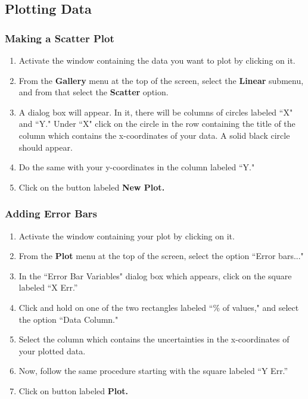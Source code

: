\subsection{Plotting Data}

\subsubsection{Making a Scatter Plot}

\noindent
\begin{enumerate}
\item Activate the window containing the data you want to plot by clicking on it.
\item From the {\bf Gallery} menu at the top of the screen, select the {\bf Linear}
submenu, and from that select the {\bf Scatter} option.
\item A dialog box will appear. In it, there will be columns of circles labeled ``X"
and ``Y." Under ``X" click on the circle in the row containing the
title of the column which contains the x-coordinates of your data. A
solid black circle should appear.
\item Do the same with your y-coordinates in the column labeled ``Y."
\item Click on the button labeled {\bf New Plot.}
\end{enumerate}
\indent

\subsubsection{Adding Error Bars}

\noindent
\begin{enumerate}
\item Activate the window containing your plot by clicking on it.
\item From the {\bf Plot} menu at the top of the screen, select the option ``Error
bars..."
\item In the ``Error Bar Variables" dialog box which appears, click on the square
labeled ``X Err.''
\item Click and hold on one of the two rectangles labeled ``\% of values," and select
the option ``Data Column."
\item Select the column which contains the uncertainties in the x-coordinates of your
plotted data.
\item Now, follow the same procedure starting with the square labeled ``Y Err.''
\item Click on button labeled {\bf Plot.}
\end{enumerate}
\indent

